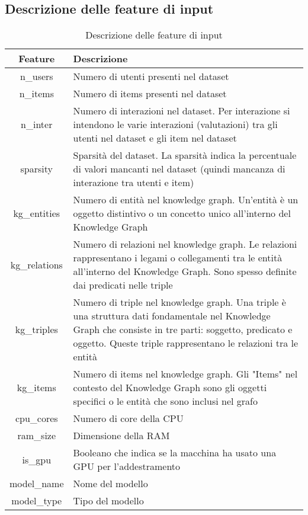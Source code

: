 \subsection{Descrizione delle feature di input}
\begin{center}
\begin{table}[H]
    \centering
    \begin{tabularx}{\textwidth}{|c|X|}
        \hline
        \textbf{Feature} & \textbf{Descrizione} \\
        \hline
        n\_users & Numero di utenti presenti nel dataset \\
        \hline
        n\_items & Numero di items presenti nel dataset \\
        \hline
        n\_inter & Numero di interazioni nel dataset. Per interazione si intendono le varie interazioni (valutazioni) tra gli utenti nel dataset e gli item nel dataset \\
        \hline
        sparsity & Sparsità del dataset. La sparsità indica la percentuale di valori mancanti nel dataset (quindi mancanza di interazione tra utenti e item)\\
        \hline
        kg\_entities & Numero di entità nel knowledge graph. Un'entità è un oggetto distintivo o un concetto unico all'interno del Knowledge Graph \\
        \hline
        kg\_relations & Numero di relazioni nel knowledge graph. Le relazioni rappresentano i legami o collegamenti tra le entità all'interno del Knowledge Graph. Sono spesso definite dai predicati nelle triple \\
        \hline
        kg\_triples & Numero di triple nel knowledge graph. Una triple è una struttura dati fondamentale nel Knowledge Graph che consiste in tre parti: soggetto, predicato e oggetto. Queste triple rappresentano le relazioni tra le entità \\
        \hline
        kg\_items & Numero di items nel knowledge graph. Gli "Items" nel contesto del Knowledge Graph sono gli oggetti specifici o le entità che sono inclusi nel grafo \\
        \hline
        cpu\_cores & Numero di core della CPU \\
        \hline
        ram\_size & Dimensione della RAM \\
        \hline
        is\_gpu & Booleano che indica se la macchina ha usato una GPU per l'addestramento \\
        \hline
        model\_name & Nome del modello \\
        \hline
        model\_type & Tipo del modello \\
        \hline
    \end{tabularx}
    \caption{Descrizione delle feature di input}
\end{table}
\end{center}

